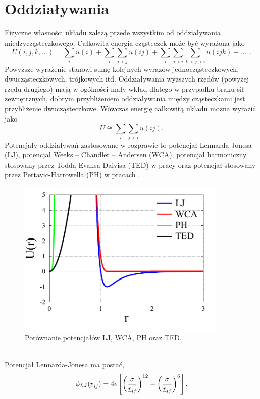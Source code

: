 \documentclass[12pt,a4paper,openright]{report} %
\begin{document}
\section{Oddziaływania}
\label{oddzialywania}
Fizyczne własności układu zależą przede wszystkim od oddziaływania międzycząsteczkowego. Całkowita energia cząsteczek może być wyrażona jako
%
\begin{equation}
U(i,j,k,...)=\sum \limits_{i} u(i) + \sum \limits_{i} \sum \limits_{j>j} u(ij) + \sum \limits_{i} \sum \limits_{j>i} \sum \limits_{k>j>i} u(ijk)+ ...~~.
\end{equation}
Powyższe wyrażenie stanowi sumę kolejnych wyrazów jednocząsteczkowych, dwucząsteczkowych, trójkowych itd. Oddziaływania wyższych rzędów (powyżej rzędu drugiego) mają w ogólności mały wkład dlatego w przypadku braku sił zewnętrznych, dobrym przybliżeniem oddziaływania między cząsteczkami jest przybliżenie dwucząsteczkowe. Wówczas energię całkowitą układu można wyrazić jako
\begin{equation}
U \cong \sum \limits_{i} \sum \limits_{j>i} u(ij).
\end{equation}
Potencjały oddziaływań zastosowane w rozprawie to potencjał Lennarda-Jonesa (LJ), potencjał Weeks – Chandler – Andersen (WCA), potencjał harmoniczny stosowany przez Todda-Evansa-Daivisa (TED) w pracy \cite{Todd} oraz potencjał stosowany przez Pertavic-Harrowella (PH) w pracach \cite{Petravic2005, PetravicHarrowell2006}. 
\begin{figure}[h]
\centering
\includegraphics[width=100mm]{rysunki/potencjaly.pdf}
\caption{Porównanie potencjałów LJ, WCA, PH oraz TED.}
\label{potencjaly}
\end{figure}
\\
{Potencjał Lennarda-Jonesa} ma postać,
\begin{equation}
\phi_{LJ}(\underline{r}_{ij})=4 \epsilon \left[ \left( \sigma \over \underline{r}_{ij} \right)^{12} - \left( \sigma \over \underline{r}_{ij} \right)^{6} \right],
\end{equation}
\end{document}
